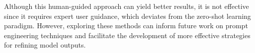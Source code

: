 Although this human-guided approach can yield better results, it is not effective since it requires expert user guidance, which deviates from the zero-shot learning paradigm. However, exploring these methods can inform future work on prompt engineering techniques and facilitate the development of more effective strategies for refining model outputs.
